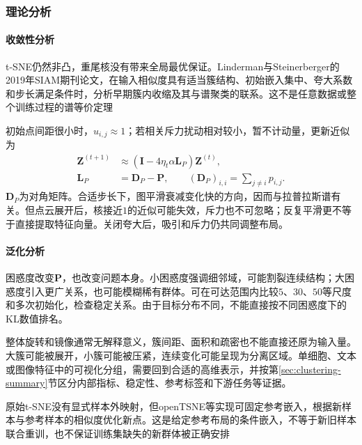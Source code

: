 \subsubsection{理论分析}
\label{sec:dim-tsne-theory}

\paragraph{收敛性分析}

t-SNE仍然非凸，重尾核没有带来全局最优保证。Linderman与Steinerberger的2019年SIAM期刊论文，在输入相似度具有适当簇结构、初始嵌入集中、夸大系数和步长满足条件时，分析早期簇内收缩及其与谱聚类的联系。这不是任意数据或整个训练过程的谱等价定理

初始点间距很小时，$u_{i,j}\approx1$；若相关斥力扰动相对较小，暂不计动量，更新近似为
\begin{equation}
  \label{eq:dim-tsne-spectral-approximation}
  \begin{aligned}
    \bm{Z}^{(t+1)}
      &\approx(\bm{I}-4\eta_t\alpha\bm{L}_{P})\bm{Z}^{(t)},\\
    \bm{L}_{P}&=\bm{D}_{P}-\bm{P},\qquad
    (\bm{D}_{P})_{i,i}=\sum_{j\ne i}p_{i,j}.
  \end{aligned}
\end{equation}
$\bm{D}_{P}$为对角矩阵。合适步长下，图平滑衰减变化快的方向，因而与拉普拉斯谱有关。但点云展开后，核接近$1$的近似可能失效，斥力也不可忽略；反复平滑更不等于直接提取特征向量。关闭夸大后，吸引和斥力仍共同调整布局。

\paragraph{泛化分析}

困惑度改变$\bm{P}$，也改变问题本身。小困惑度强调细邻域，可能割裂连续结构；大困惑度引入更广关系，也可能模糊稀有群体。可在可达范围内比较$5$、$30$、$50$等尺度和多次初始化，检查稳定关系。由于目标分布不同，不能直接按不同困惑度下的KL数值排名。

整体旋转和镜像通常无解释意义，簇间距、面积和疏密也不能直接还原为输入量。大簇可能被展开，小簇可能被压紧，连续变化可能呈现为分离区域。单细胞、文本或图像特征中的可视化分组，需要回到合适的高维表示，并按第\ref{sec:clustering-summary}节区分内部指标、稳定性、参考标签和下游任务等证据。

原始t-SNE没有显式样本外映射，但openTSNE等实现可固定参考嵌入，根据新样本与参考样本的相似度优化新点。这是给定参考布局的条件嵌入，不等于新旧样本联合重训，也不保证训练集缺失的新群体被正确安排

